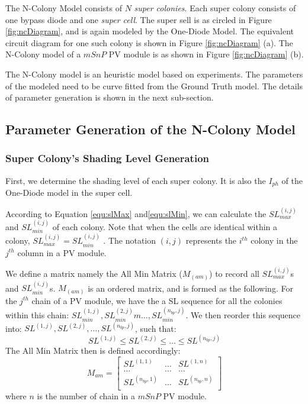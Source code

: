The N-Colony Model consists of $N$  \textit{super colonies}. Each super colony consists of one bypass diode and one \textit{super cell}. The super sell is as circled in Figure \ref{fig:ncDiagram}, and is again modeled by the One-Diode Model. The equivalent circuit diagram for one such colony is shown in Figure \ref{fig:ncDiagram} (a). The N-Colony model of a $mSnP$ PV module is as shown in Figure \ref{fig:ncDiagram} (b).

The N-Colony model is an heuristic model based on experiments. The parameters of the modeled need to be curve fitted from the Ground Truth model. The details of parameter generation is shown in the next sub-section.
\subsection{Parameter Generation of the N-Colony Model}
\subsubsection{Super Colony's Shading Level Generation}
First, we determine the shading level of each super colony. It is also the $I_{ph}$ of the One-Diode model in the super cell.

According to Equation \ref{equ:slMax} and\ref{equ:slMin}, we can calculate the $SL_{max}^{(i,j)}$ and $SL_{min}^{(i,j)}$ of each colony. Note that when the cells are identical within a colony, $SL_{max}^{(i,j)} = SL_{min}^{(i,j)}$ . The notation $(i,j)$ represents the $i^{th}$ colony in the $j^{th}$ column in a PV module.

We define a matrix namely the All Min Matrix ($M_(am)$) to record all $SL_{max}^{(i,j)}$s and $SL_{min}^{(i,j)}$s. $M_(am)$ is an ordered matrix, and is formed as the following. For the $j^{th}$ chain of a PV module, we have the a SL sequence for all the colonies within this chain: $SL_{min}^{(1,j)},SL_{min}^{(2,j)}m \dots,SL_{min}^{(n_{bp},j)}$. We then reorder this sequence into: $SL^{(1,j)},SL^{(2,j)}, \dots,SL^{(n_{bp},j)}$, such that:
\begin{equation}\label{equ:slChain}
  SL^{(1,j)} \le SL^{(2,j)} \le \dots \le SL^{(n_{bp},j)}
\end{equation}
The All Min Matrix then is defined accordingly:
\begin{equation}\label{equ:Mam}
M_{am} =
\begin{bmatrix}
 SL^{(1,1)} & \dots & SL^{(1,n)} \\
 \dots & \dots & \dots \\
 SL^{(n_{bp},1)} & \dots & SL^{(n_{bp},n)} \\
\end{bmatrix}
\end{equation}
where $n$ is the number of chain in a $mSnP$ PV module.


